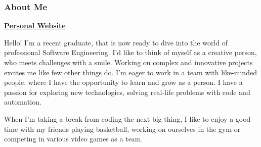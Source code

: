 \documentclass[]{resume}
\begin{document}
\begin{minipage}[t]{0.64\textwidth} 
\subsubsection{About Me} \hfill \href{https://home-claydelas.vercel.app/}{\bf Personal Website}

Hello! I'm a recent graduate, that is now ready to dive into the world of professional Software Engineering. I'd like to think of myself as a creative person, who meets challenges with a smile. Working on complex and innovative projects excites me like few other things do. I'm eager to work in a team with like-minded people, where I have the opportunity to learn and grow as a person. I have a passion for exploring new technologies, solving real-life problems with code and automation.

When I'm taking a break from coding the next big thing, I like to enjoy a good time with my friends playing basketball, working on ourselves in the gym or competing in various video games as a team.
\sectionsep


\end{minipage}
\end{document}
